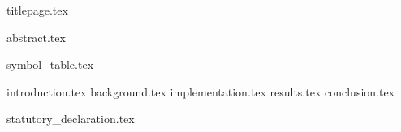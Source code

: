 \documentclass[11pt,fleqn,twoside,ngerman]{article}
\let\stdsection\section
\renewcommand*\section{\cleardoublepage\thispagestyle{sectionstyle}\stdsection}
\begin{document}
  {titlepage.tex}

  \setcounter{page}{0}

  \cleardoublepage
  {
    \thispagestyle{sectionstyle}
    \let\section\stdsection
    {abstract.tex}
    \bigskip
    \tableofcontents
  }

  \listoffigures

  {symbol_table.tex}

  \cleardoublepage
  {introduction.tex}
  {background.tex}
  {implementation.tex}
  {results.tex}
  {conclusion.tex}

  \nocite{*}
  
  

  \cleardoublepage
  \appendix

  \cleardoublepage
  {statutory_declaration.tex}
\end{document}
